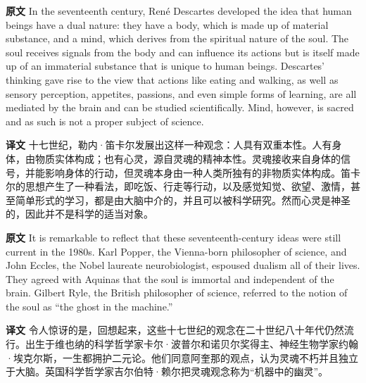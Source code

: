 \documentclass[UTF8]{ctexart}
\newenvironment{english}{\par\small\noindent\textbf{原文}\quad\ignorespaces}{\par}
\newenvironment{zhtranslation}{\par\noindent\textbf{译文}\quad\ignorespaces}{\par\vspace{0.35em}}
\begin{document}
\begin{english}
In the seventeenth century, René Descartes developed the idea that human beings have a dual nature: they have a body, which is made up of material substance, and a mind, which derives from the spiritual nature of the soul. The soul receives signals from the body and can influence its actions but is itself made up of an immaterial substance that is unique to human beings. Descartes' thinking gave rise to the view that actions like eating and walking, as well as sensory perception, appetites, passions, and even simple forms of learning, are all mediated by the brain and can be studied scientifically. Mind, however, is sacred and as such is not a proper subject of science.
\end{english}
\begin{zhtranslation}
十七世纪，勒内·笛卡尔发展出这样一种观念：人具有双重本性。人有身体，由物质实体构成；也有心灵，源自灵魂的精神本性。灵魂接收来自身体的信号，并能影响身体的行动，但灵魂本身由一种人类所独有的非物质实体构成。笛卡尔的思想产生了一种看法，即吃饭、行走等行动，以及感觉知觉、欲望、激情，甚至简单形式的学习，都是由大脑中介的，并且可以被科学研究。然而心灵是神圣的，因此并不是科学的适当对象。\end{zhtranslation}

\begin{english}
It is remarkable to reflect that these seventeenth-century ideas were still current in the 1980s. Karl Popper, the Vienna-born philosopher of science, and John Eccles, the Nobel laureate neurobiologist, espoused dualism all of their lives. They agreed with Aquinas that the soul is immortal and independent of the brain. Gilbert Ryle, the British philosopher of science, referred to the notion of the soul as “the ghost in the machine.”\end{english}
\begin{zhtranslation}
令人惊讶的是，回想起来，这些十七世纪的观念在二十世纪八十年代仍然流行。出生于维也纳的科学哲学家卡尔·波普尔和诺贝尔奖得主、神经生物学家约翰·埃克尔斯，一生都拥护二元论。他们同意阿奎那的观点，认为灵魂不朽并且独立于大脑。英国科学哲学家吉尔伯特·赖尔把灵魂观念称为“机器中的幽灵”。\end{zhtranslation}
\end{document}
